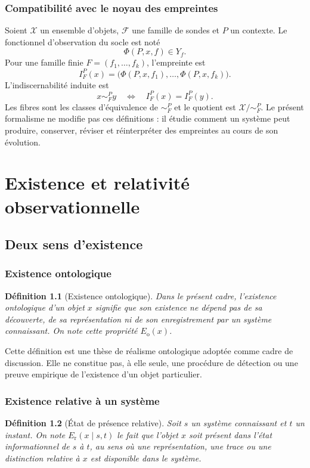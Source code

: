 \documentclass[11pt,a4paper,openany]{book}
\newtheorem{definition}{Définition}[chapter]
\newcommand{\X}{\mathcal X}
\newcommand{\F}{\mathcal F}
\begin{document}
\section{Compatibilité avec le noyau des empreintes}
Soient $\X$ un ensemble d'objets, $\F$ une famille de sondes et $P$ un contexte. Le fonctionnel d'observation du socle est noté
\[
\Phi(P,x,f)\in Y_f.
\]
Pour une famille finie $F=(f_1,\ldots,f_k)$, l'empreinte est
\[
I_F^P(x)=\bigl(\Phi(P,x,f_1),\ldots,\Phi(P,x,f_k)\bigr).
\]
L'indiscernabilité induite est
\[
x\sim_F^P y\quad\Longleftrightarrow\quad I_F^P(x)=I_F^P(y).
\]
Les fibres sont les classes d'équivalence de $\sim_F^P$ et le quotient est $\X/{\sim_F^P}$. Le présent formalisme ne modifie pas ces définitions : il étudie comment un système peut produire, conserver, réviser et réinterpréter des empreintes au cours de son évolution.

\part{Existence et relativité observationnelle}
\chapter{Deux sens d'existence}

\section{Existence ontologique}
\begin{definition}[Existence ontologique]
Dans le présent cadre, l'existence ontologique d'un objet $x$ signifie que son existence ne dépend pas de sa découverte, de sa représentation ni de son enregistrement par un système connaissant. On note cette propriété $E_{\mathrm{o}}(x)$.
\end{definition}

Cette définition est une thèse de réalisme ontologique adoptée comme cadre de discussion. Elle ne constitue pas, à elle seule, une procédure de détection ou une preuve empirique de l'existence d'un objet particulier.

\section{Existence relative à un système}
\begin{definition}[État de présence relative]
Soit $s$ un système connaissant et $t$ un instant. On note $E_{\mathrm{r}}(x\mid s,t)$ le fait que l'objet $x$ soit présent dans l'état informationnel de $s$ à $t$, au sens où une représentation, une trace ou une distinction relative à $x$ est disponible dans le système.
\end{definition}
\end{document}
